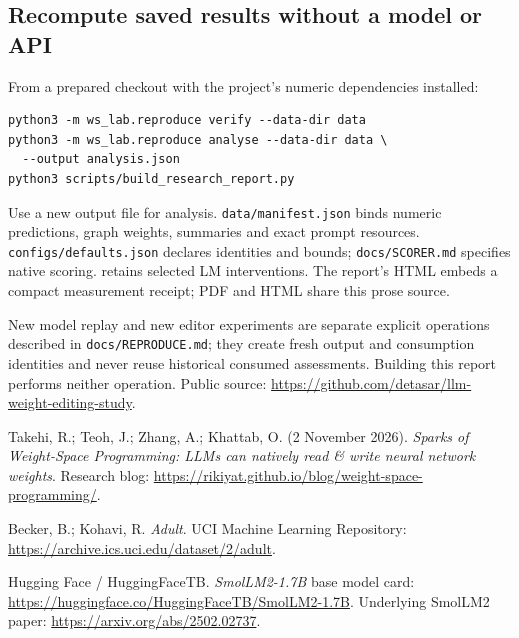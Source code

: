 \subsection*{Recompute saved results without a model or API}
From a prepared checkout with the project's numeric dependencies installed:
\begin{verbatim}
python3 -m ws_lab.reproduce verify --data-dir data
python3 -m ws_lab.reproduce analyse --data-dir data \
  --output analysis.json
python3 scripts/build_research_report.py
\end{verbatim}
Use a new output file for analysis. \texttt{data/manifest.json} binds numeric predictions, graph weights, summaries and exact prompt resources. \texttt{configs/defaults.json} declares identities and bounds; \texttt{docs/SCORER.md} specifies native scoring.  retains selected LM interventions. The report's HTML embeds a compact measurement receipt; PDF and HTML share this prose source.

New model replay and new editor experiments are separate explicit operations described in \texttt{docs/REPRODUCE.md}; they create fresh output and consumption identities and never reuse historical consumed assessments. Building this report performs neither operation. Public source: \url{https://github.com/detasar/llm-weight-editing-study}.


Takehi, R.; Teoh, J.; Zhang, A.; Khattab, O. (2 November 2026). \emph{Sparks of Weight-Space Programming: LLMs can natively read \& write neural network weights}. Research blog: \url{https://rikiyat.github.io/blog/weight-space-programming/}.

Becker, B.; Kohavi, R. \emph{Adult}. UCI Machine Learning Repository: \url{https://archive.ics.uci.edu/dataset/2/adult}.

Hugging Face / HuggingFaceTB. \emph{SmolLM2-1.7B} base model card: \url{https://huggingface.co/HuggingFaceTB/SmolLM2-1.7B}. Underlying SmolLM2 paper: \url{https://arxiv.org/abs/2502.02737}.

